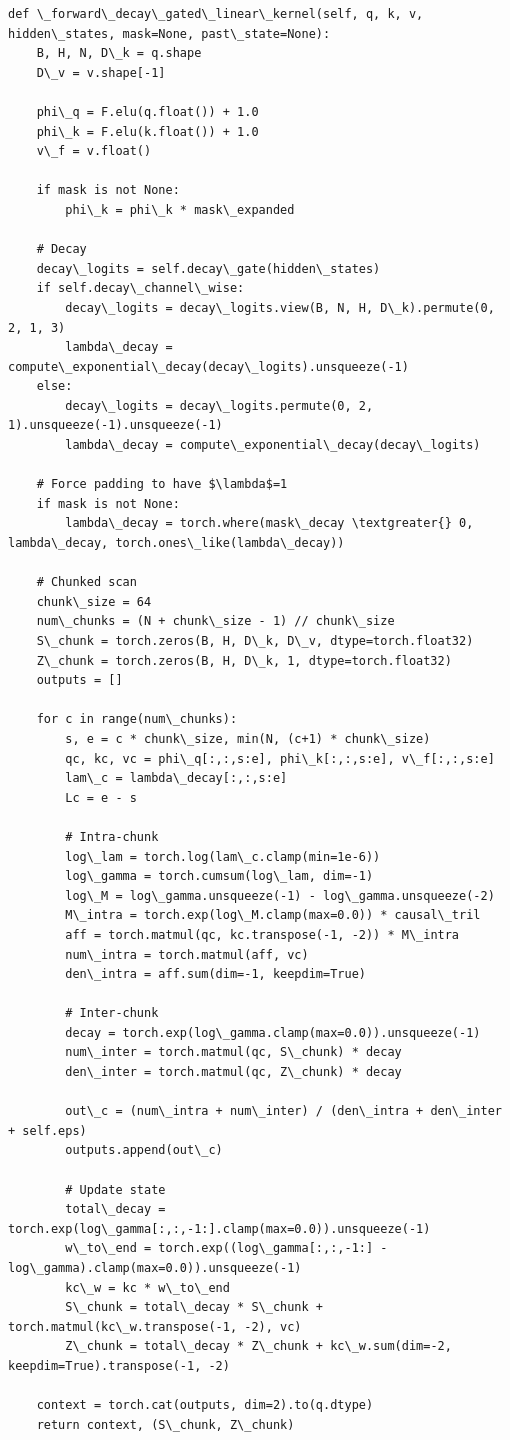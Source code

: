 \begin{lstlisting}
def \_forward\_decay\_gated\_linear\_kernel(self, q, k, v, hidden\_states, mask=None, past\_state=None):
    B, H, N, D\_k = q.shape
    D\_v = v.shape[-1]
    
    phi\_q = F.elu(q.float()) + 1.0
    phi\_k = F.elu(k.float()) + 1.0
    v\_f = v.float()
    
    if mask is not None:
        phi\_k = phi\_k * mask\_expanded
    
    # Decay
    decay\_logits = self.decay\_gate(hidden\_states)
    if self.decay\_channel\_wise:
        decay\_logits = decay\_logits.view(B, N, H, D\_k).permute(0, 2, 1, 3)
        lambda\_decay = compute\_exponential\_decay(decay\_logits).unsqueeze(-1)
    else:
        decay\_logits = decay\_logits.permute(0, 2, 1).unsqueeze(-1).unsqueeze(-1)
        lambda\_decay = compute\_exponential\_decay(decay\_logits)
    
    # Force padding to have $\lambda$=1
    if mask is not None:
        lambda\_decay = torch.where(mask\_decay \textgreater{} 0, lambda\_decay, torch.ones\_like(lambda\_decay))
    
    # Chunked scan
    chunk\_size = 64
    num\_chunks = (N + chunk\_size - 1) // chunk\_size
    S\_chunk = torch.zeros(B, H, D\_k, D\_v, dtype=torch.float32)
    Z\_chunk = torch.zeros(B, H, D\_k, 1, dtype=torch.float32)
    outputs = []
    
    for c in range(num\_chunks):
        s, e = c * chunk\_size, min(N, (c+1) * chunk\_size)
        qc, kc, vc = phi\_q[:,:,s:e], phi\_k[:,:,s:e], v\_f[:,:,s:e]
        lam\_c = lambda\_decay[:,:,s:e]
        Lc = e - s
        
        # Intra-chunk
        log\_lam = torch.log(lam\_c.clamp(min=1e-6))
        log\_gamma = torch.cumsum(log\_lam, dim=-1)
        log\_M = log\_gamma.unsqueeze(-1) - log\_gamma.unsqueeze(-2)
        M\_intra = torch.exp(log\_M.clamp(max=0.0)) * causal\_tril
        aff = torch.matmul(qc, kc.transpose(-1, -2)) * M\_intra
        num\_intra = torch.matmul(aff, vc)
        den\_intra = aff.sum(dim=-1, keepdim=True)
        
        # Inter-chunk
        decay = torch.exp(log\_gamma.clamp(max=0.0)).unsqueeze(-1)
        num\_inter = torch.matmul(qc, S\_chunk) * decay
        den\_inter = torch.matmul(qc, Z\_chunk) * decay
        
        out\_c = (num\_intra + num\_inter) / (den\_intra + den\_inter + self.eps)
        outputs.append(out\_c)
        
        # Update state
        total\_decay = torch.exp(log\_gamma[:,:,-1:].clamp(max=0.0)).unsqueeze(-1)
        w\_to\_end = torch.exp((log\_gamma[:,:,-1:] - log\_gamma).clamp(max=0.0)).unsqueeze(-1)
        kc\_w = kc * w\_to\_end
        S\_chunk = total\_decay * S\_chunk + torch.matmul(kc\_w.transpose(-1, -2), vc)
        Z\_chunk = total\_decay * Z\_chunk + kc\_w.sum(dim=-2, keepdim=True).transpose(-1, -2)
    
    context = torch.cat(outputs, dim=2).to(q.dtype)
    return context, (S\_chunk, Z\_chunk)
\end{lstlisting}

